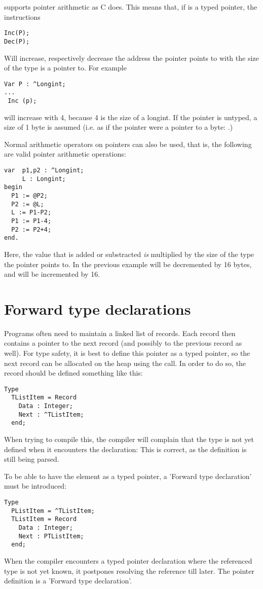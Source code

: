 \fpc supports pointer arithmetic as C does. This means that, if  is a
typed pointer, the instructions
\begin{verbatim}
Inc(P);
Dec(P);
\end{verbatim}
Will increase, respectively decrease the address the pointer points to
with the size of the type  is a pointer to. For example
\begin{verbatim}
Var P : ^Longint;
...
 Inc (p);
\end{verbatim}
will increase  with 4, because 4 is the size of a longint. If the
pointer is untyped, a size of 1 byte is assumed (i.e. as if the pointer were
a pointer to a byte: .)

Normal arithmetic operators  on pointers can also be used, 
that is, the following are valid pointer arithmetic operations:
\begin{verbatim}
var  p1,p2 : ^Longint;
     L : Longint;
begin
  P1 := @P2;
  P2 := @L;
  L := P1-P2;
  P1 := P1-4;
  P2 := P2+4;
end.
\end{verbatim}
Here, the value that is added or substracted {\em is } multiplied by the
size of the type the pointer points to. In the previous
example  will be decremented by 16 bytes, and 
 will be incremented by 16.

\section{Forward type declarations}
Programs often need to maintain a linked list of records. Each record then
contains a pointer to the next record (and possibly to the previous record
as well). For type safety, it is best to define this pointer as a typed
pointer, so the next record can be allocated on the heap using the 
call. In order to do so, the record should be defined something like this:
\begin{verbatim}
Type
  TListItem = Record
    Data : Integer;
    Next : ^TListItem;
  end;
\end{verbatim}  
When trying to compile this, the compiler will complain that the
 type is not yet defined when it encounters the 
declaration: This is correct, as the definition is still being parsed.

To be able to have the  element as a typed pointer, a 'Forward
type declaration' must be introduced:
\begin{verbatim}
Type
  PListItem = ^TListItem;
  TListItem = Record
    Data : Integer;
    Next : PTListItem;
  end;
\end{verbatim}  
When the compiler encounters a typed pointer declaration where the
referenced type is not yet known, it postpones resolving the reference till
later. The pointer definition is a 'Forward type declaration'. 

